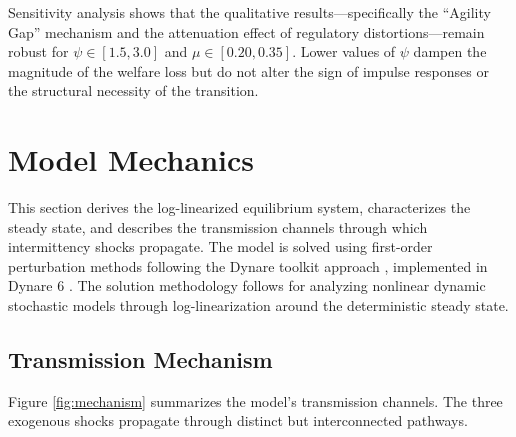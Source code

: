\documentclass[12pt, a4paper]{article}
\begin{document}
Sensitivity analysis shows that the qualitative results---specifically the ``Agility Gap'' mechanism and the attenuation effect of regulatory distortions---remain robust for $\psi \in [1.5, 3.0]$ and $\mu \in [0.20, 0.35]$. Lower values of $\psi$ dampen the magnitude of the welfare loss but do not alter the sign of impulse responses or the structural necessity of the transition.

\section{Model Mechanics} \label{sec:mechanics}

This section derives the log-linearized equilibrium system, characterizes the steady state, and describes the transmission channels through which intermittency shocks propagate. The model is solved using first-order perturbation methods following the Dynare toolkit approach \citep{Adjemianetal2024}, implemented in Dynare 6 \citep{Adjemianetal2024}. The solution methodology follows \citet{uhlig1999} for analyzing nonlinear dynamic stochastic models through log-linearization around the deterministic steady state.

\subsection{Transmission Mechanism}

Figure \ref{fig:mechanism} summarizes the model's transmission channels. The three exogenous shocks propagate through distinct but interconnected pathways.
\end{document}
